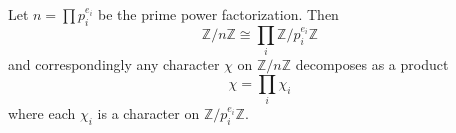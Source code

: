 Let $n = \prod p_i^{e_i}$ be the prime power factorization. Then
$$\mathbb{Z}/n\mathbb{Z} \cong \prod_i \mathbb{Z}/p_i^{e_i}\mathbb{Z}$$
and correspondingly any character $\chi$ on $\mathbb{Z}/n\mathbb{Z}$ decomposes as a product
$$\chi = \prod_i \chi_i$$
where each $\chi_i$ is a character on $\mathbb{Z}/p_i^{e_i}\mathbb{Z}$.
